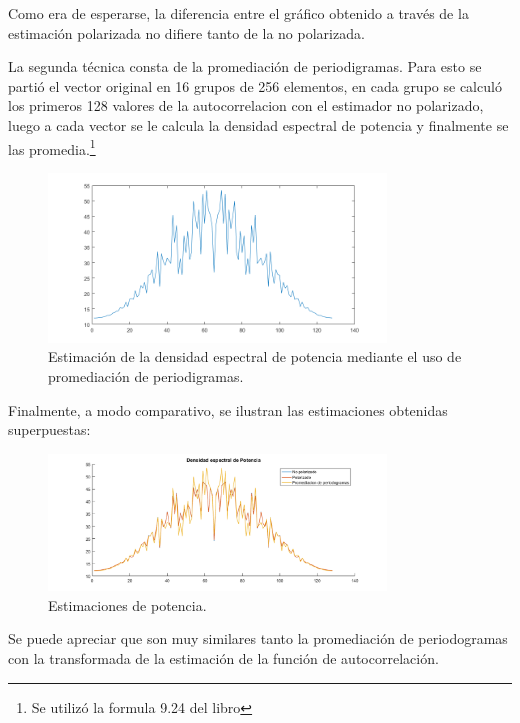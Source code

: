 
Como era de esperarse, la diferencia entre el gráfico obtenido a través de la estimación polarizada no difiere tanto de la no polarizada.

La segunda técnica consta de la promediación de periodigramas. Para esto se partió el vector original en 16 grupos de 256 elementos, en cada grupo se calculó los primeros 128 valores de la autocorrelacion con el estimador no polarizado, luego a cada vector se le calcula la densidad espectral de potencia y finalmente se las promedia.\footnote{Se utilizó la formula 9.24 del libro}
\begin{figure}[H]
\centering
	\includegraphics[width=0.8\textwidth, trim = {0 0 0 0.725cm},clip]{./ImagenesEjercicio2/period-calc.png}
	\caption{Estimación de la densidad espectral de potencia mediante el uso de promediación de periodigramas.}
	\label{fig:fft-calc}
\end{figure}



Finalmente, a modo comparativo, se ilustran las estimaciones obtenidas superpuestas:
\begin{figure}[H]
\centering
	\includegraphics[width=0.8\textwidth, trim = {0 0 0 0.725cm},clip]{./ImagenesEjercicio2/fft2.png}
	\caption{Estimaciones de potencia.}
	\label{fig:fft2}
\end{figure}
Se puede apreciar que son muy similares tanto la promediación de periodogramas con la transformada de la estimación de la función de autocorrelación.
%